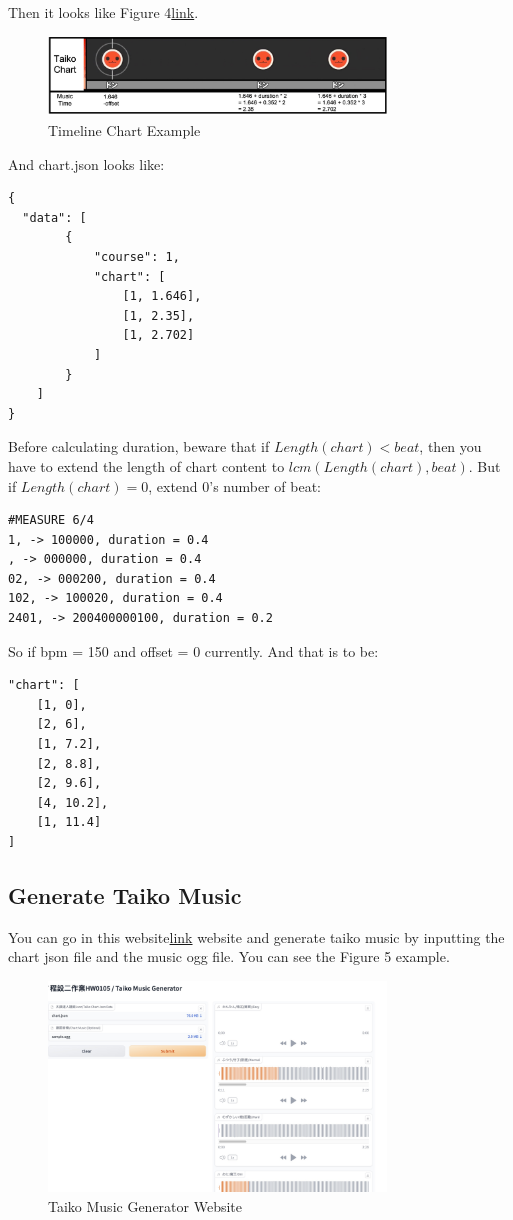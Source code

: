 \documentclass[a4paper,11pt, ctexart]{article}
\begin{document}
Then it looks like Figure 4{\href{https://youtu.be/Fv2t7NqJVZE?si=UTd9gqh7ALQBbVu8&t=13}{\tiny link}}.

\begin{figure}[h]
    \centering
    \includegraphics[width=0.8\textwidth]{assets/timeline-chart-example.jpg}
    \caption{Timeline Chart Example}
\end{figure}

And chart.json looks like:
\begin{lstlisting}
{
  "data": [
        {
            "course": 1,
            "chart": [
                [1, 1.646],
                [1, 2.35],
                [1, 2.702]
            ]
        }
    ]
}
\end{lstlisting}

Before calculating duration, beware that if $ Length(chart) < beat $, then you have to extend the length of chart content to $ lcm(Length(chart), beat) $. But if $Length(chart) = 0$,  extend 0's number of beat:

\begin{lstlisting}
#MEASURE 6/4
1, -> 100000, duration = 0.4
, -> 000000, duration = 0.4
02, -> 000200, duration = 0.4
102, -> 100020, duration = 0.4
2401, -> 200400000100, duration = 0.2
\end{lstlisting}

So if bpm = 150 and offset = 0 currently. And that is to be:
\begin{lstlisting}
"chart": [
    [1, 0],
    [2, 6],
    [1, 7.2],
    [2, 8.8],
    [2, 9.6],
    [4, 10.2],
    [1, 11.4]
]
\end{lstlisting}

\subsection{Generate Taiko Music}
You can go in this website{\href{https://huggingface.co/spaces/ryanlinjui/taiko-music-generator}{\tiny link}} website and generate taiko music by inputting the chart json file and the music ogg file. You can see the Figure 5 example.

\begin{figure}[h]
    \centering
    \includegraphics[width=0.8\textwidth]{assets/web.jpg}
    \caption{Taiko Music Generator Website}
\end{figure}
\end{document}

